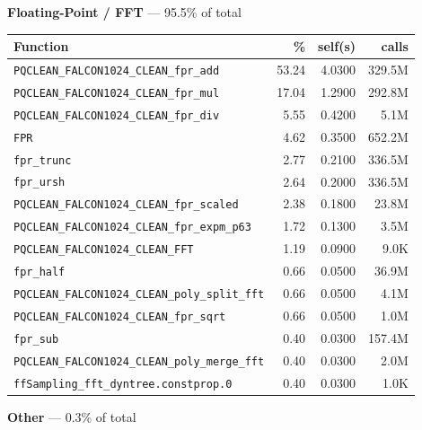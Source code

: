 \documentclass[11pt,a4paper]{article}
\begin{document}
\noindent\colorbox{fpcolor}{\strut \textbf{Floating-Point / FFT} --- 95.5\% of total}
\vspace{2pt}

\begin{longtable}{p{7.5cm}rrr}
\toprule
Function & \% & self(s) & calls \\
\midrule
\endhead
  \texttt{PQCLEAN\_FALCON1024\_CLEAN\_fpr\_add} & 53.24 & 4.0300 & 329.5M \\
  \texttt{PQCLEAN\_FALCON1024\_CLEAN\_fpr\_mul} & 17.04 & 1.2900 & 292.8M \\
  \texttt{PQCLEAN\_FALCON1024\_CLEAN\_fpr\_div} & 5.55 & 0.4200 & 5.1M \\
  \texttt{FPR} & 4.62 & 0.3500 & 652.2M \\
  \texttt{fpr\_trunc} & 2.77 & 0.2100 & 336.5M \\
  \texttt{fpr\_ursh} & 2.64 & 0.2000 & 336.5M \\
  \texttt{PQCLEAN\_FALCON1024\_CLEAN\_fpr\_scaled} & 2.38 & 0.1800 & 23.8M \\
  \texttt{PQCLEAN\_FALCON1024\_CLEAN\_fpr\_expm\_p63} & 1.72 & 0.1300 & 3.5M \\
  \texttt{PQCLEAN\_FALCON1024\_CLEAN\_FFT} & 1.19 & 0.0900 & 9.0K \\
  \texttt{fpr\_half} & 0.66 & 0.0500 & 36.9M \\
  \texttt{PQCLEAN\_FALCON1024\_CLEAN\_poly\_split\_fft} & 0.66 & 0.0500 & 4.1M \\
  \texttt{PQCLEAN\_FALCON1024\_CLEAN\_fpr\_sqrt} & 0.66 & 0.0500 & 1.0M \\
  \texttt{fpr\_sub} & 0.40 & 0.0300 & 157.4M \\
  \texttt{PQCLEAN\_FALCON1024\_CLEAN\_poly\_merge\_fft} & 0.40 & 0.0300 & 2.0M \\
  \texttt{ffSampling\_fft\_dyntree.constprop.0} & 0.40 & 0.0300 & 1.0K \\
\bottomrule
\end{longtable}

\noindent\colorbox{othercolor}{\strut \textbf{Other} --- 0.3\% of total}
\vspace{2pt}
\end{document}
